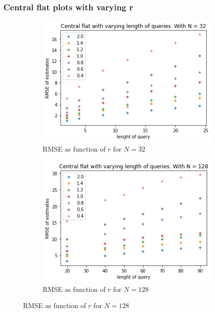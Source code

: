 \documentclass[11pt]{article}
\theoremstyle{definition}
\begin{document}
\subsubsection{Central flat plots with varying r}\label{app:cen_r}
\begin{figure}[H]
\centering
\begin{subfigure}{.4\textwidth}
  \centering
  \includegraphics[width=\linewidth]{figures/central_flat/varying_r/cen_flat_varying_length_N=32.png}
  \caption{RMSE as function of $r$ for $N=32$}
  \label{fig:1}
\end{subfigure}%
\begin{subfigure}{.4\textwidth}
  \centering
  \includegraphics[width=\linewidth]{figures/central_flat/varying_r/cen_flat_varying_length_N=128.png}
  \caption{RMSE as function of $r$ for $N=128$}

\end{subfigure}
\end{figure}
\end{document}
